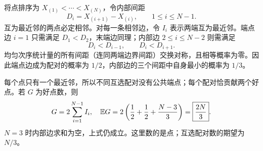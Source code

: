 将点排序为 $X_{(1)}<\cdots<X_{(N)}$，令内部间距
\[
D_i=X_{(i+1)}-X_{(i)},\qquad 1\le i\le N-1.
\]
互为最近邻的两点必定相邻。对每一条相邻边，令 $I_i$ 表示两端互为最近邻。端点边 $i=1$ 只需满足 $D_1<D_2$，末端边同理；内部边 $2\le i\le N-2$ 则需满足
\[
D_i<D_{i-1},\qquad D_i<D_{i+1}.
\]
均匀次序统计量的所有间距（连同两端边界间距）交换对称，且相等概率为零。因此端点边成为配对的概率为 $1/2$，内部边的三个间距中自身最小的概率为 $1/3$。

每个点只有一个最近邻，所以不同互选配对没有公共端点；每个配对恰贡献两个好点。若 $G$ 为好点数，则
\[
G=2\sum_{i=1}^{N-1}I_i,
\quad
\mathbb{E} G=2\left(\frac12+\frac12+\frac{N-3}{3}\right)
=\boxed{\frac{2N}{3}}.
\]
$N=3$ 时内部边求和为空，上式仍成立。这里数的是点；互选配对数的期望为 $N/3$。
